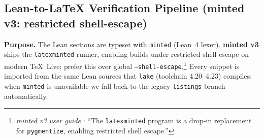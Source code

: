\documentclass[11pt,letterpaper,oneside]{article}
\numberwithin{equation}{section}
\newcommand{\1}{\mathbf{1}}
\begin{document}
\subsection{Lean-to-LaTeX Verification Pipeline (minted v3: restricted shell-escape)}\label{sec:lean-minted-workflow}

\begin{tcolorbox}[didacticstyle]
  \textbf{Purpose.} The Lean sections are typeset with \texttt{minted} (Lean~4 lexer). \textbf{minted v3} ships the \texttt{latexminted} runner, enabling builds under restricted shell-escape on modern TeX~Live; prefer this over global \texttt{--shell-escape}.\footnote{\emph{minted v3 user guide} \cite{mintedv3}: ``The \texttt{latexminted} program is a drop-in replacement for \texttt{pygmentize}, enabling restricted shell escape.''} Every snippet is imported from the same Lean sources that \texttt{lake} (toolchain 4.20--4.23) compiles; when \texttt{minted} is unavailable we fall back to the legacy \texttt{listings} branch automatically.
\end{tcolorbox}
\end{document}
